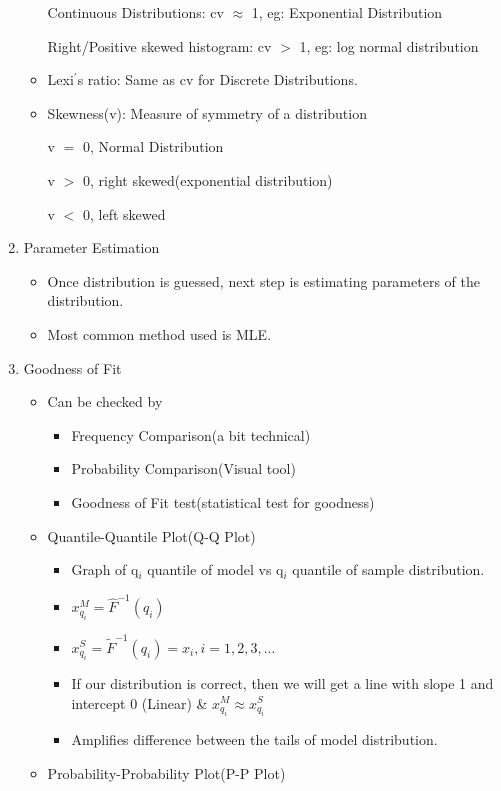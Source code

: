 \documentclass[a4paper]{article}
\begin{document}
\begin{enumerate}
\begin{itemize}
			Continuous Distributions: cv $\approx$ 1, eg: Exponential Distribution
			
			Right/Positive skewed histogram: cv $>$ 1, eg: log normal distribution
			\item Lexi$^{'}$s ratio: Same as cv for Discrete Distributions.
			\item Skewness(v): Measure of symmetry of a distribution
			
			v $=$ 0, Normal Distribution
			
			v $>$ 0, right skewed(exponential distribution)
			
			v $<$ 0, left skewed 
		\end{itemize}
		\item Parameter Estimation
		\begin{itemize}
			\item Once distribution is guessed, next step is estimating parameters of the distribution.
			\item Most common method used is MLE.
		\end{itemize}
		\item Goodness of Fit
		\begin{itemize}
			\item Can be checked by
			\begin{itemize}
				\item Frequency Comparison(a bit technical)
				\item Probability Comparison(Visual tool)
				\item Goodness of Fit test(statistical test for goodness) 
			\end{itemize}
			\item Quantile-Quantile Plot(Q-Q Plot)
			\begin{itemize}
				\item Graph of q$_{i}$ quantile of model vs q$_{i}$ quantile of sample distribution.
				\item $x_{q_{i}}^{M} = \hat{F}^{-1}(q_{i})$
				\item $x_{q_{i}}^{S} = \tilde{F}^{-1}(q_{i}) = x_{i}, i = 1,2,3,...$
				\item If our distribution is correct, then we will get a line with slope 1 and intercept 0 (Linear) \& $x_{q_{i}}^{M} \approx x_{q_{i}}^{S}$
				\item Amplifies difference between the tails of model distribution.
			\end{itemize}
			\item Probability-Probability Plot(P-P Plot)
			\begin{itemize}

\end{itemize}
\end{itemize}
\end{enumerate}
\end{document}
